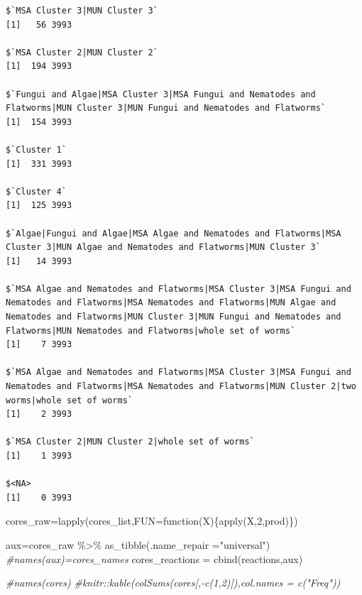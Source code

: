 \documentclass[
  letterpaper,
  DIV=11,
  numbers=noendperiod]{scrreprt}
\newenvironment{Shaded}{}{}
\newcommand{\AttributeTok}[1]{\textcolor[rgb]{0.78,0.47,0.87}{#1}}
\newcommand{\CommentTok}[1]{\textcolor[rgb]{0.36,0.39,0.44}{\textit{#1}}}
\newcommand{\ControlFlowTok}[1]{\textcolor[rgb]{0.78,0.47,0.87}{#1}}
\newcommand{\DecValTok}[1]{\textcolor[rgb]{0.82,0.60,0.40}{#1}}
\newcommand{\FunctionTok}[1]{\textcolor[rgb]{0.38,0.69,0.94}{#1}}
\newcommand{\NormalTok}[1]{\textcolor[rgb]{0.67,0.70,0.75}{#1}}
\newcommand{\OtherTok}[1]{\textcolor[rgb]{0.15,0.68,0.38}{#1}}
\newcommand{\SpecialCharTok}[1]{\textcolor[rgb]{0.34,0.71,0.76}{#1}}
\newcommand{\StringTok}[1]{\textcolor[rgb]{0.60,0.76,0.47}{#1}}
\begin{document}
\begin{verbatim}
$`MSA Cluster 3|MUN Cluster 3`
[1]   56 3993

$`MSA Cluster 2|MUN Cluster 2`
[1]  194 3993

$`Fungui and Algae|MSA Cluster 3|MSA Fungui and Nematodes and Flatworms|MUN Cluster 3|MUN Fungui and Nematodes and Flatworms`
[1]  154 3993

$`Cluster 1`
[1]  331 3993

$`Cluster 4`
[1]  125 3993

$`Algae|Fungui and Algae|MSA Algae and Nematodes and Flatworms|MSA Cluster 3|MUN Algae and Nematodes and Flatworms|MUN Cluster 3`
[1]   14 3993

$`MSA Algae and Nematodes and Flatworms|MSA Cluster 3|MSA Fungui and Nematodes and Flatworms|MSA Nematodes and Flatworms|MUN Algae and Nematodes and Flatworms|MUN Cluster 3|MUN Fungui and Nematodes and Flatworms|MUN Nematodes and Flatworms|whole set of worms`
[1]    7 3993

$`MSA Algae and Nematodes and Flatworms|MSA Cluster 3|MSA Fungui and Nematodes and Flatworms|MSA Nematodes and Flatworms|MUN Cluster 2|two worms|whole set of worms`
[1]    2 3993

$`MSA Cluster 2|MUN Cluster 2|whole set of worms`
[1]    1 3993

$<NA>
[1]    0 3993
\end{verbatim}

\begin{Shaded}
\begin{Highlighting}[]
\NormalTok{cores\_raw}\OtherTok{=}\FunctionTok{lapply}\NormalTok{(cores\_list,}\AttributeTok{FUN=}\ControlFlowTok{function}\NormalTok{(X)\{}\FunctionTok{apply}\NormalTok{(X,}\DecValTok{2}\NormalTok{,prod)\})}

\NormalTok{aux}\OtherTok{=}\NormalTok{cores\_raw }\SpecialCharTok{\%\textgreater{}\%} \FunctionTok{as\_tibble}\NormalTok{(}\AttributeTok{.name\_repair =}\StringTok{"universal"}\NormalTok{)}
\CommentTok{\#names(aux)=cores\_names}
\NormalTok{cores\_reactions }\OtherTok{=} \FunctionTok{cbind}\NormalTok{(reactions,aux)}
\end{Highlighting}
\end{Shaded}

\begin{Shaded}
\begin{Highlighting}[]
\CommentTok{\#names(cores)}
\CommentTok{\#knitr::kable(colSums(cores[,{-}c(1,2)]),col.names = c("Freq"))}
\end{Highlighting}
\end{Shaded}
\end{document}
